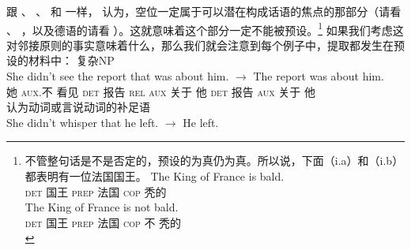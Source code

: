 \noindent
跟 \citet{Erteschik81a}、 \citet{EL79a}、 \citet{Takami88a}
和 \citet{vanValin98a}一样， \citet[\S~7.2]{Goldberg2006a}认为，空位一定属于可以潜在构成话语的焦点的那部分（请看 、 ，以及德语的请看
 ）。这就意味着这个部分一定不能被预设。\footnote{%
不管整句话是不是否定的，预设的为真仍为真。所以说，下面（i.a）和（i.b）都表明有一位法国国王。
  \eal
  \ex 
  \gll The King of France is bald.\\
  \textsc{det} 国王 \textsc{prep} 法国 \textsc{cop} 秃的\\
  \ex 
  \gll The King of France is not bald.\\
  \textsc{det} 国王 \textsc{prep} 法国 \textsc{cop} 不 秃的\\
  \zllast
}
如果我们考虑这对邻接原则的事实意味着什么，那么我们就会注意到每个例子中，提取都发生在预设的材料中：
\eal
\ex 复杂NP\\
\gll She didn't see the report that was about him. $\to$ The report was about him.\\
她 \textsc{aux}.不 看见 \textsc{det} 报告 \textsc{rel} \textsc{aux} 关于 他 {} \textsc{det} 报告 \textsc{aux} 关于 他\\
\ex 认为动词或言说动词的补足语\\
\gll She didn't whisper that he left. $\to$ He left.\\
